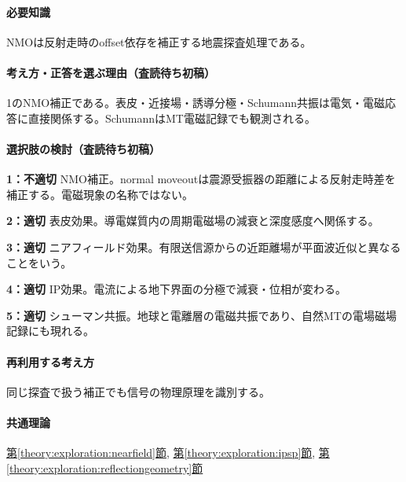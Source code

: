 \paragraph{必要知識} NMOは反射走時のoffset依存を補正する地震探査処理である。

\paragraph{考え方・正答を選ぶ理由（査読待ち初稿）} 1のNMO補正である。表皮・近接場・誘導分極・Schumann共振は電気・電磁応答に直接関係する。SchumannはMT電磁記録でも観測される。

\paragraph{選択肢の検討（査読待ち初稿）}\mbox{}\par

\noindent\textbf{1：不適切} NMO補正。normal moveoutは震源受振器の距離による反射走時差を補正する。電磁現象の名称ではない。\par

\noindent\textbf{2：適切} 表皮効果。導電媒質内の周期電磁場の減衰と深度感度へ関係する。\par

\noindent\textbf{3：適切} ニアフィールド効果。有限送信源からの近距離場が平面波近似と異なることをいう。\par

\noindent\textbf{4：適切} IP効果。電流による地下界面の分極で減衰・位相が変わる。\par

\noindent\textbf{5：適切} シューマン共振。地球と電離層の電磁共振であり、自然MTの電場磁場記録にも現れる。\par

\paragraph{再利用する考え方} 同じ探査で扱う補正でも信号の物理原理を識別する。

\paragraph{共通理論} \hyperref[theory:exploration:nearfield]{第\ref*{theory:exploration:nearfield}節}, \hyperref[theory:exploration:ipsp]{第\ref*{theory:exploration:ipsp}節}, \hyperref[theory:exploration:reflectiongeometry]{第\ref*{theory:exploration:reflectiongeometry}節}

